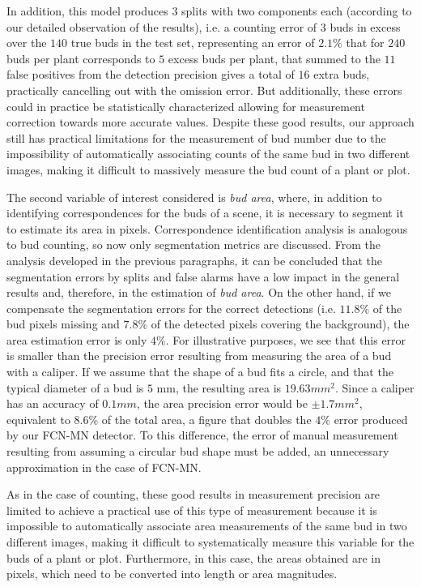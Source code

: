 \documentclass[a4paper,authoryear,review]{elsarticle}
\begin{document}
In addition, this model produces $3$ splits with two components each (according to our detailed observation of the results), i.e. a counting error of $3$ buds in excess over the $140$ true buds in the test set, representing an error of $2.1\%$ that for $240$ buds per plant corresponds to $5$ excess buds per plant, that summed to the $11$ false positives from the detection precision gives a total of $16$ extra buds, practically cancelling out with the omission error. But additionally, these errors could in practice be statistically characterized allowing for measurement correction towards more accurate values. Despite these good results, our approach still has practical limitations for the measurement of bud number due to the impossibility of automatically associating counts of the same bud in two different images, making it difficult to massively measure the bud count of a plant or plot. 

The second variable of interest considered is \emph{bud area}, where, in addition to identifying correspondences for the buds of a scene, it is necessary to segment it to estimate its area in pixels. Correspondence identification analysis is analogous to bud counting, so now only segmentation metrics are discussed. From the analysis developed in the previous paragraphs, it can be concluded that the segmentation errors by splits and false alarms have a low impact in the general results and, therefore, in the estimation of \emph{bud area}. On the other hand, if we compensate the segmentation errors for the correct detections (i.e. $11.8\%$ of the bud pixels missing and $7.8\%$ of the detected pixels covering the background), the area estimation error is only $4\%$. For illustrative purposes, we see that this error is smaller than the precision error resulting from measuring the area of a bud with a caliper. If we assume that the shape of a bud fits a circle, and that the typical diameter of a bud is $5$ mm, the resulting area is $19.63 mm^2$. Since a caliper has an accuracy of $0.1 mm$, the area precision error would be $\pm 1.7 mm^2$, equivalent to $8.6\%$ of the total area, a figure that doubles the $4\%$ error produced by our FCN-MN detector. To this difference,  the error of manual measurement resulting from assuming a circular bud shape must be added, an unnecessary approximation in the case of FCN-MN.

As in the case of counting, these good results in measurement precision are limited to achieve a practical use of this type of measurement because it is impossible to automatically associate area measurements of the same bud in two different images, making it difficult to systematically measure this variable for the buds of a plant or plot. Furthermore, in this case, the areas obtained are in pixels, which need to be converted into length or area magnitudes.
\end{document}
